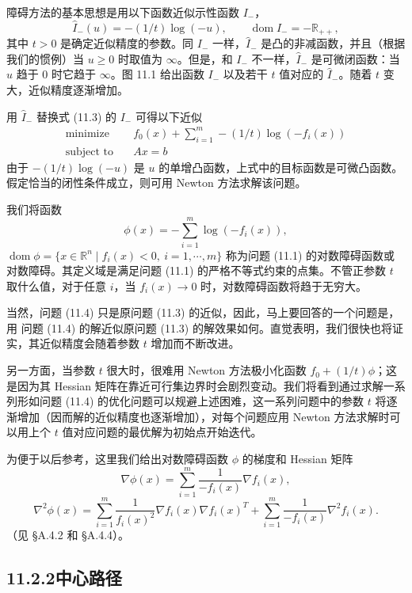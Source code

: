 \documentclass[UTF8,12pt,a4paper,fontset=fandol]{ctexart}
\begin{document}
障碍方法的基本思想是用以下函数近似示性函数 $I_-$，
\[
\hat{I}_-(u)=-(1/t)\log(-u),\qquad \operatorname{dom}\hat{I}_-=-\mathbb{R}_{++},
\]
其中 $t>0$ 是确定近似精度的参数。同 $I_-$ 一样，$\hat{I}_-$ 是凸的非减函数，并且（根据我们的惯例）当 $u\geq 0$ 时取值为 $\infty$。但是，和 $I_-$ 不一样，$\hat{I}_-$ 是可微闭函数：当 $u$ 趋于 $0$ 时它趋于 $\infty$。图 11.1 给出函数 $I_-$ 以及若干 $t$ 值对应的 $\hat{I}_-$。随着 $t$ 变大，近似精度逐渐增加。

用 $\hat{I}_-$ 替换式 (11.3) 的 $I_-$ 可得以下近似
\begin{equation}
\begin{aligned}
\text{minimize}\quad & f_0(x)+\sum_{i=1}^m -(1/t)\log(-f_i(x))\\
\text{subject to}\quad & Ax=b
\end{aligned}
\tag{11.4}
\end{equation}
由于 $-(1/t)\log(-u)$ 是 $u$ 的单增凸函数，上式中的目标函数是可微凸函数。假定恰当的闭性条件成立，则可用 Newton 方法求解该问题。

我们将函数
\begin{equation}
\phi(x)=-\sum_{i=1}^m\log(-f_i(x)),
\tag{11.5}
\end{equation}
$\operatorname{dom}\phi=\{x\in\mathbb{R}^n\mid f_i(x)<0,\ i=1,\cdots,m\}$ 称为问题 (11.1) 的对数障碍函数或对数障碍。其定义域是满足问题 (11.1) 的严格不等式约束的点集。不管正参数 $t$ 取什么值，对于任意 $i$，当 $f_i(x)\to 0$ 时，对数障碍函数将趋于无穷大。

当然，问题 (11.4) 只是原问题 (11.3) 的近似，因此，马上要回答的一个问题是，用
问题 (11.4) 的解近似原问题 (11.3) 的解效果如何。直觉表明，我们很快也将证实，其近似精度会随着参数 $t$ 增加而不断改进。

另一方面，当参数 $t$ 很大时，很难用 Newton 方法极小化函数 $f_0+(1/t)\phi$；这是因为其 Hessian 矩阵在靠近可行集边界时会剧烈变动。我们将看到通过求解一系列形如问题 (11.4) 的优化问题可以规避上述困难，这一系列问题中的参数 $t$ 将逐渐增加（因而解的近似精度也逐渐增加），对每个问题应用 Newton 方法求解时可以用上个 $t$ 值对应问题的最优解为初始点开始迭代。

为便于以后参考，这里我们给出对数障碍函数 $\phi$ 的梯度和 Hessian 矩阵
\[
\nabla\phi(x)=\sum_{i=1}^m \frac{1}{-f_i(x)}\nabla f_i(x),
\]
\[
\nabla^2\phi(x)=\sum_{i=1}^m \frac{1}{f_i(x)^2}\nabla f_i(x)\nabla f_i(x)^T+\sum_{i=1}^m \frac{1}{-f_i(x)}\nabla^2 f_i(x).
\]
（见 \S A.4.2 和 \S A.4.4）。

\subsection*{11.2.2\quad 中心路径}
\end{document}
